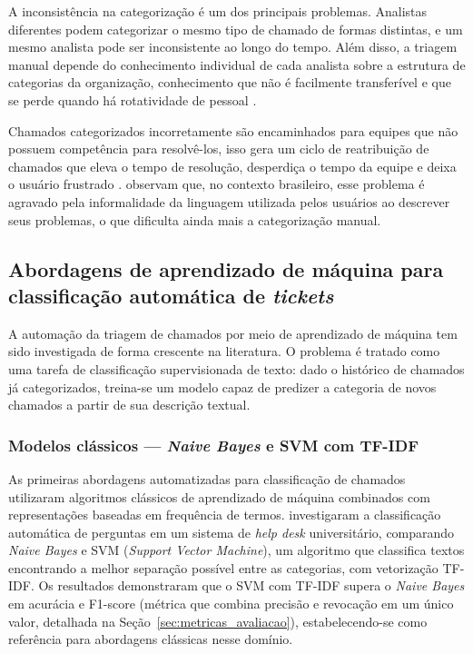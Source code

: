 \documentclass[
    12pt,                %
    openright,           %
    oneside,             %
    a4paper,             %
    english,             %
    brazil               %
]{abntex2}
\begin{document}
A inconsistência na categorização é um dos principais problemas. Analistas diferentes podem categorizar o mesmo tipo de chamado de formas distintas, e um mesmo analista pode ser inconsistente ao longo do tempo. Além disso, a triagem manual depende do conhecimento individual de cada analista sobre a estrutura de categorias da organização, conhecimento que não é facilmente transferível e que se perde quando há rotatividade de pessoal \cite{wahba2023}.

Chamados categorizados incorretamente são encaminhados para equipes que não possuem competência para resolvê-los, isso gera um ciclo de reatribuição de chamados que eleva o tempo de resolução, desperdiça o tempo da equipe e deixa o usuário frustrado \cite{harun2023}.  observam que, no contexto brasileiro, esse problema é agravado pela informalidade da linguagem utilizada pelos usuários ao descrever seus problemas, o que dificulta ainda mais a categorização manual.

\subsection{Abordagens de aprendizado de máquina para classificação automática de \textit{tickets}}
\label{subsec:helpdesk_ml}

A automação da triagem de chamados por meio de aprendizado de máquina tem sido investigada de forma crescente na literatura. O problema é tratado como uma tarefa de classificação supervisionada de texto: dado o histórico de chamados já categorizados, treina-se um modelo capaz de predizer a categoria de novos chamados a partir de sua descrição textual.

\subsubsection{Modelos clássicos — \textit{Naive Bayes} e SVM com TF-IDF}
\label{subsubsec:helpdesk_classicos}

As primeiras abordagens automatizadas para classificação de chamados utilizaram algoritmos clássicos de aprendizado de máquina combinados com representações baseadas em frequência de termos.  investigaram a classificação automática de perguntas em um sistema de \textit{help desk} universitário, comparando \textit{Naive Bayes} e SVM (\textit{Support Vector Machine}), um algoritmo que classifica textos encontrando a melhor separação possível entre as categorias, com vetorização TF-IDF. Os resultados demonstraram que o SVM com TF-IDF supera o \textit{Naive Bayes} em acurácia e F1-score (métrica que combina precisão e revocação em um único valor, detalhada na Seção~\ref{sec:metricas_avaliacao}), estabelecendo-se como referência para abordagens clássicas nesse domínio.
\end{document}
